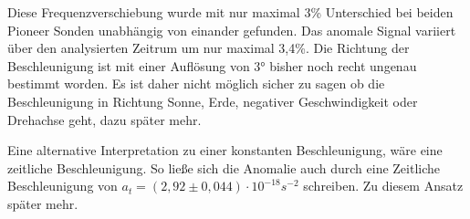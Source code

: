 Diese Frequenzverschiebung wurde mit nur maximal 3\% Unterschied bei beiden Pioneer Sonden unabhängig von einander
gefunden. Das anomale Signal variiert über den analysierten Zeitrum um nur maximal 3,4\%.\cite{Turyshev2004} Die Richtung der
Beschleunigung ist mit einer Auflösung von 3° bisher noch recht ungenau bestimmt worden. Es ist daher nicht möglich
sicher zu sagen ob die Beschleunigung
in Richtung Sonne, Erde, negativer Geschwindigkeit oder Drehachse geht, dazu später mehr.

Eine alternative Interpretation zu einer konstanten Beschleunigung, wäre eine zeitliche Beschleunigung.
So ließe sich die Anomalie auch durch eine Zeitliche Beschleunigung von $a_t = (2,92 \pm 0,044) \cdot 10^{-18} s^{-2}$ schreiben. Zu diesem Ansatz später mehr.

